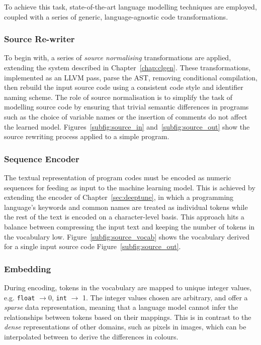To achieve this task, state-of-the-art language modelling techniques are employed, coupled with a series of generic, language-agnostic code transformations.

\subsubsection{Source Re-writer}

To begin with, a series of \emph{source normalising} transformations are applied, extending the system described in Chapter~\ref{chap:clgen}. These transformations, implemented as an LLVM pass, parse the AST, removing conditional compilation, then rebuild the input source code using a consistent code style and identifier naming scheme. The role of source normalisation is to simplify the task of modelling source code by ensuring that trivial semantic differences in programs such as the choice of variable names or the insertion of comments do not affect the learned model. Figures~\ref{subfig:source_in} and~\ref{subfig:source_out} show the source rewriting process applied to a simple program.

\subsubsection{Sequence Encoder}

The textual representation of program codes must be encoded as numeric sequences for feeding as input to the machine learning model. This is achieved by extending the encoder of Chapter~\ref{sec:deeptune}, in which a programming language's keywords and common names are treated as individual tokens while the rest of the text is encoded on a character-level basis. This approach hits a balance between compressing the input text and keeping the number of tokens in the vocabulary low. Figure~\ref{subfig:source_vocab} shows the vocabulary derived for a single input source code Figure~\ref{subfig:source_out}.

\subsubsection{Embedding}

During encoding, tokens in the vocabulary are mapped to unique integer values, e.g. \texttt{float} $\rightarrow 0$, \texttt{int} $\rightarrow$ 1. The integer values chosen are arbitrary, and offer a \emph{sparse} data representation, meaning that a language model cannot infer the relationships between tokens based on their mappings. This is in contrast to the \emph{dense} representations of other domains, such as pixels in images, which can be interpolated between to derive the differences in colours.

